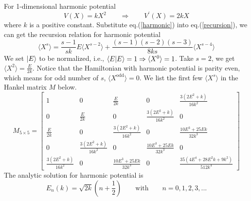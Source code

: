 \documentclass[10pt]{article}
\begin{document}
For 1-dimensional harmonic potential
\begin{equation}\label{harmonic}
    V(X)=kX^2 \qquad \Rightarrow \qquad V^\prime(X)=2kX
\end{equation}
where $k$ is a positive constant. Substitute eq.(\ref{harmonic}) into eq.(\ref{recursion}), we can get the recursion relation for harmonic potential
\begin{equation}
    \langle X^s\rangle = \frac{s-1}{sk}E\langle X^{s-2}\rangle
    + \frac{(s-1)(s-2)(s-3)}{8ks}\langle X^{s-4}\rangle
\end{equation}
We set $\ket{E}$ to be normalized, i.e., $\braket{E}=1\Rightarrow\langle X^0\rangle=1$. Take $s=2$, we get $\langle X^2\rangle=\frac{E}{2k}$. Notice that the Hamiltonian with harmonic potential is parity even, which means for odd number of $s$, $\langle X^{\text{odd}}\rangle=0$. We list the first few $\langle X^s\rangle$ in the Hankel matrix $M$ below.
\begin{equation*}
    M_{5\times5} = \left[\begin{matrix}1 & 0 & \frac{E}{2 k} & 0 & \frac{3 \left(2 E^{2} + k\right)}{16 k^{2}}\\0 & \frac{E}{2 k} & 0 & \frac{3 \left(2 E^{2} + k\right)}{16 k^{2}} & 0\\\frac{E}{2 k} & 0 & \frac{3 \left(2 E^{2} + k\right)}{16 k^{2}} & 0 & \frac{10 E^{3} + 25 E k}{32 k^{3}}\\0 & \frac{3 \left(2 E^{2} + k\right)}{16 k^{2}} & 0 & \frac{10 E^{3} + 25 E k}{32 k^{3}} & 0\\\frac{3 \left(2 E^{2} + k\right)}{16 k^{2}} & 0 & \frac{10 E^{3} + 25 E k}{32 k^{3}} & 0 & \frac{35 \left(4 E^{4} + 28 E^{2} k + 9 k^{2}\right)}{512 k^{4}}\end{matrix}\right]
\end{equation*}
The analytic solution for harmonic potential is
\begin{equation}
    E_n(k) = \sqrt{2k}(n+\frac{1}{2}) \qquad \text{with} \qquad n=0,1,2,3,...
\end{equation}
\end{document}
